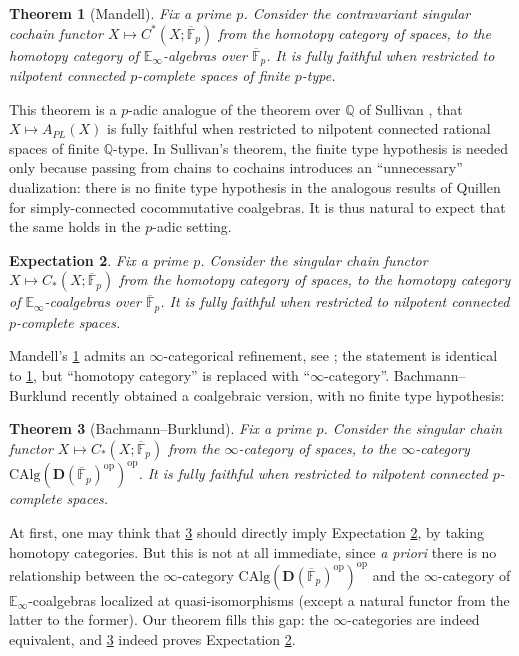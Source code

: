 \documentclass[a4paper,12pt]{amsart}
\theoremstyle{plain}
\newtheorem{theorem}{Theorem}[section]
\newtheorem{expectation}[theorem]{Expectation}%
\theoremstyle{definition}
\theoremstyle{remark}
\begin{document}
	\begin{theorem}[Mandell]\label{mandell}
		Fix a prime $p$. Consider the contravariant singular cochain functor $X \mapsto C^*(X;\overline{\mathbb{F}}_p)$ from the homotopy category of spaces, to the homotopy category of $\mathbb E_\infty$-algebras over $\overline{\mathbb{F}}_p$. It is fully faithful when restricted to  nilpotent connected $p$-complete spaces of finite $p$-type.
	\end{theorem}
This theorem is a $p$-adic analogue of the theorem over $\mathbb Q$ of  Sullivan \cite{sullivan}, that $X \mapsto A_{\mathit{PL}}(X)$ is fully faithful when restricted to nilpotent connected rational spaces of finite $\mathbb Q$-type. In Sullivan's theorem, the finite type hypothesis is needed only because passing from chains to cochains introduces an ``unnecessary'' dualization: there is no finite type hypothesis in the analogous results of Quillen \cite{quillen69} for simply-connected cocommutative coalgebras. It is thus natural to expect that the same holds in the $p$-adic setting.


\begin{expectation}\label{expectation2}
	Fix a prime $p$. Consider the singular chain functor $X \mapsto C_*(X;\overline{\mathbb{F}}_p)$ from the homotopy category of spaces, to the homotopy category of $\mathbb E_\infty$-coalgebras over $\overline{\mathbb{F}}_p$. It is fully faithful when restricted to  nilpotent connected $p$-complete spaces.
\end{expectation}

Mandell's \cref{mandell} admits an $\infty$-categorical refinement, see \cite{Lurie11Rational}; the statement is identical to \cref{mandell}, but ``homotopy category'' is replaced with ``$\infty$-category''. Bachmann--Burklund \cite{bachmann2024} recently obtained a coalgebraic version, with no finite type hypothesis:
	

	\begin{theorem}[Bachmann--Burklund]\label{bb} Fix a prime $p$. Consider the singular chain functor $X \mapsto C_*(X;\overline{\mathbb{F}}_p)$ from the $\infty$-category of spaces, to the $\infty$-category $\mathrm{CAlg}(\mathbf D(\overline{\mathbb{F}}_p)^{\mathrm{op}})^{\mathrm{op}}$. It is fully faithful when restricted to  nilpotent connected $p$-complete spaces.
	\end{theorem} 

At first, one may think that \cref{bb} should directly imply Expectation \ref{expectation2}, by taking homotopy categories. But this is not at all immediate, since \emph{a priori} there is no relationship between the $\infty$-category $\mathrm{CAlg}(\mathbf D(\overline{\mathbb{F}}_p)^{\mathrm{op}})^{\mathrm{op}}$ and the $\infty$-category of $\mathbb E_\infty$-coalgebras localized at quasi-isomorphisms (except a natural functor from the latter to the former). Our theorem fills this gap: the $\infty$-categories are indeed equivalent, and \cref{bb} indeed proves Expectation \ref{expectation2}.
\end{document}
